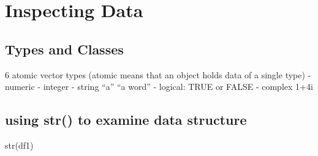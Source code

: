 \documentclass[
]{book}
\newenvironment{Shaded}{\begin{snugshade}}{\end{snugshade}}
\newcommand{\FunctionTok}[1]{\textcolor[rgb]{0.00,0.00,0.00}{#1}}
\newcommand{\NormalTok}[1]{#1}
\begin{document}
\hypertarget{inspecting-data}{%
\section{Inspecting Data}\label{inspecting-data}}

\hypertarget{types-and-classes}{%
\subsection{Types and Classes}\label{types-and-classes}}

6 atomic vector types (atomic means that an object holds data of a single type) - numeric - integer - string ``a'' ``a word'' - logical: TRUE or FALSE - complex 1+4i

\hypertarget{using-str-to-examine-data-structure}{%
\subsection{using str() to examine data structure}\label{using-str-to-examine-data-structure}}

\begin{Shaded}
\begin{Highlighting}[]
\FunctionTok{str}\NormalTok{(df1)}
\end{Highlighting}
\end{Shaded}
\end{document}

